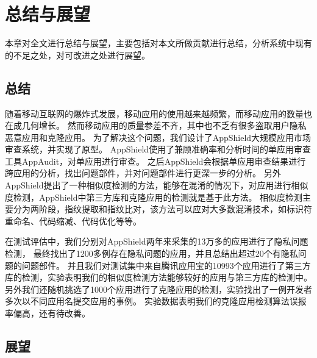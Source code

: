 \chapter{总结与展望}
\label{chap:conclusion}

本章对全文进行总结与展望，主要包括对本文所做贡献进行总结，分析系统中现有的不足之处，对可改进之处进行展望。

\section{总结}

随着移动互联网的爆炸式发展，移动应用的使用越来越频繁，而移动应用的数量也在成几何增长。
然而移动应用的质量参差不齐，其中也不乏有很多盗取用户隐私恶意应用和克隆应用。
为了解决这个问题，我们设计了AppShield大规模应用市场审查系统，并实现了原型。
AppShield使用了兼顾准确率和分析时间的单应用审查工具AppAudit，对单应用进行审查。
之后AppShield会根据单应用审查结果进行跨应用的分析，找出问题部件，并对问题部件进行更深一步的分析。
另外AppShield提出了一种相似度检测的方法，能够在混淆的情况下，对应用进行相似度检测，AppShield中第三方库和克隆应用的检测就是基于此方法。
相似度检测主要分为两阶段，指纹提取和指纹比对，该方法可以应对大多数混淆技术，如标识符重命名、代码缩减、代码优化等等。

在测试评估中，我们分别对AppShield两年来采集的13万多的应用进行了隐私问题检测，
最终找出了1200多例存在隐私问题的应用，并且总结出超过20个有隐私问题的问题部件。
并且我们对测试集中来自腾讯应用宝的10993个应用进行了第三方库的检测，实验表明我们的相似度检测方法能够较好的应用与第三方库的检测中。
另外我们还随机挑选了1000个应用进行了克隆应用的检测，实验找出了一例开发者多次以不同应用名提交应用的事例。
实验数据表明我们的克隆应用检测算法误报率偏高，还有待改善。

\section{展望}

